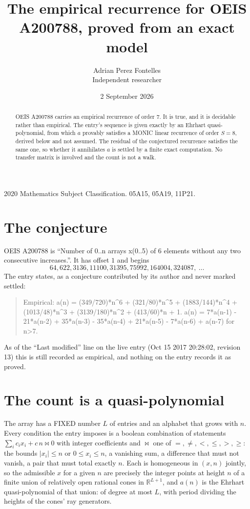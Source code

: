 \documentclass[11pt,a4paper]{article}
\title{The empirical recurrence for OEIS A200788, proved from an exact model}
\author{Adrian Perez Fontelles\\ \small Independent researcher}
\date{2 September 2026}
\theoremstyle{plain}
\theoremstyle{definition}
\begin{document}
\maketitle

\begin{abstract}
OEIS A200788 carries an empirical recurrence of order $7$. It is true, and it is
decidable rather than empirical. The entry's sequence is given exactly by an Ehrhart quasi-polynomial, from
which $a$ provably satisfies a MONIC linear recurrence of order $S=8$, derived below and not
assumed. The residual of the conjectured recurrence satisfies the same one, so whether it
annihilates $a$ is settled by a finite exact computation. No transfer matrix is involved and
the count is not a walk.
\end{abstract}

\noindent\small 2020 Mathematics Subject Classification. 05A15, 05A19, 11P21.\normalsize

\section{The conjecture}

OEIS A200788 is ``Number of 0..n arrays x(0..5) of 6 elements without any two consecutive increases.''. It has offset $1$ and begins
\[
64, 622, 3136, 11100, 31395, 75992, 164004, 324087,\ \dots
\]
The entry states, as a conjecture contributed by its author and never marked settled:
\begin{quote}
Empirical: a(n) = (349/720)*n\^{}6 + (321/80)*n\^{}5 + (1883/144)*n\^{}4 + (1013/48)*n\^{}3 + (3139/180)*n\^{}2 + (413/60)*n + 1. a(n) = 7*a(n-1) - 21*a(n-2) + 35*a(n-3) - 35*a(n-4) + 21*a(n-5) - 7*a(n-6) + a(n-7) for n>7.
\end{quote}
As of the ``Last modified'' line on the live entry (Oct 15 2017 20:28:02, revision 13)
this is still recorded as empirical, and nothing on the entry records it as proved.

\section{The count is a quasi-polynomial}

The array has a FIXED number $L$ of entries and an alphabet that grows with $n$. Every
condition the entry imposes is a boolean combination of statements
$\sum_i c_ix_i + c\,n \bowtie 0$ with integer coefficients and $\bowtie$ one of
$=,\ne,<,\le,>,\ge$: the bounds $|x_i|\le n$ or $0\le x_i\le n$, a vanishing sum, a difference
that must not vanish, a pair that must total exactly $n$. Each is homogeneous in $(x,n)$
jointly, so the admissible $x$ for a given $n$ are precisely the integer points at height $n$
of a finite union of relatively open rational cones in $\mathbb{R}^{L+1}$, and $a(n)$ is
the Ehrhart quasi-polynomial of that union: of degree at most $L$, with period dividing the
heights of the cones' ray generators.
\end{document}
